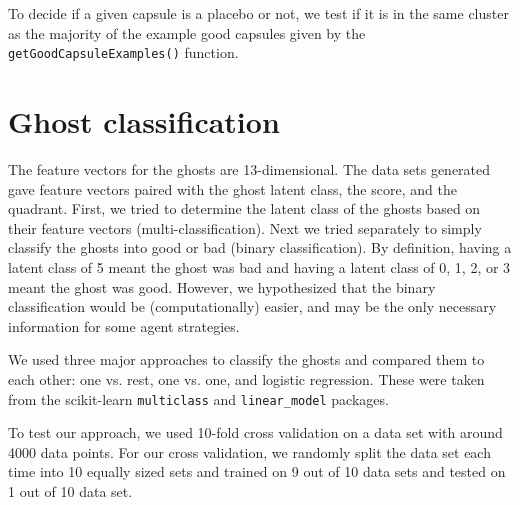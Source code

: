 \documentclass[11pt]{amsart}
\begin{document}
To decide if a given capsule is a placebo or not, we test if it is in the same cluster as the majority of the example good capsules given by the \texttt{getGoodCapsuleExamples()} function.

\pagebreak

\section{Ghost classification}

The feature vectors for the ghosts are 13-dimensional. The data sets generated gave feature vectors paired with the ghost latent class, the score, and the quadrant. First, we tried to determine the latent class of the ghosts based on their feature vectors (multi-classification). Next we tried separately to simply classify the ghosts into good or bad (binary classification). By definition, having a latent class of 5 meant the ghost was bad and having a latent class of 0, 1, 2, or 3 meant the ghost was good. However, we hypothesized that the binary classification would be (computationally) easier, and may be the only necessary information for some agent strategies.

We used three major approaches to classify the ghosts and compared them to each other: one vs. rest, one vs. one, and logistic regression. These were taken from the scikit-learn \texttt{multiclass} and \texttt{linear\_model} packages.

To test our approach, we used 10-fold cross validation on a data set with around 4000 data points. For our cross validation, we randomly split the data set each time into 10 equally sized sets and trained on 9 out of 10 data sets and tested on 1 out of 10 data set. 
\end{document}
